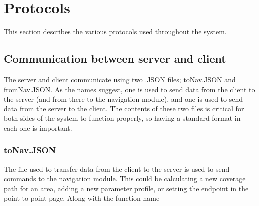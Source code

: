 \section{Protocols}

{This section describes the various protocols used throughout the system.}

\subsection{Communication between server and client}

The server and client communicate using two .JSON files; toNav.JSON and fromNav.JSON. As the names suggest, one is used to send data from the client to the server (and from there to the navigation module), and one is used to send data from the server to the client. The contents of these two files is critical for both sides of the system to function properly, so having a standard format in each one is important. 

\subsubsection{toNav.JSON}

The file used to transfer data from the client to the server is used to send commands to the navigation module. This could be calculating a new coverage path for an area, adding a new parameter profile, or setting the endpoint in the point to point page. Along with the function name 